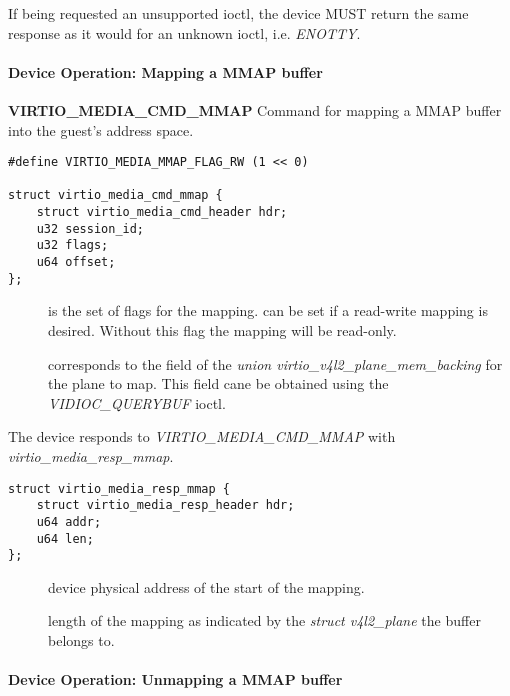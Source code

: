 
If being requested an unsupported ioctl, the device MUST return the same
response as it would for an unknown ioctl, i.e. \textit{ENOTTY}.

\paragraph{Device Operation: Mapping a MMAP buffer}

\textbf{VIRTIO_MEDIA_CMD_MMAP} Command for mapping a MMAP buffer into the
guest's address space.

\begin{lstlisting}
#define VIRTIO_MEDIA_MMAP_FLAG_RW (1 << 0)

struct virtio_media_cmd_mmap {
	struct virtio_media_cmd_header hdr;
	u32 session_id;
	u32 flags;
	u64 offset;
};
\end{lstlisting}

\begin{description}
\item[] is the set of flags for the mapping. 
can be set if a read-write mapping is desired. Without this flag the mapping
will be read-only.
\item[] corresponds to the  field of the
\textit{union virtio_v4l2_plane_mem_backing} for the plane to map. This field
cane be obtained using the \textit{VIDIOC_QUERYBUF} ioctl.
\end{description}

The device responds to \textit{VIRTIO_MEDIA_CMD_MMAP} with \textit{virtio_media_resp_mmap}.

\begin{lstlisting}
struct virtio_media_resp_mmap {
    struct virtio_media_resp_header hdr;
    u64 addr;
    u64 len;
};
\end{lstlisting}

\begin{description}
\item[] device physical address of the start of the mapping.
\item[] length of the mapping as indicated by the \textit{struct v4l2_plane}
the buffer belongs to.
\end{description}

\paragraph{Device Operation: Unmapping a MMAP buffer}

